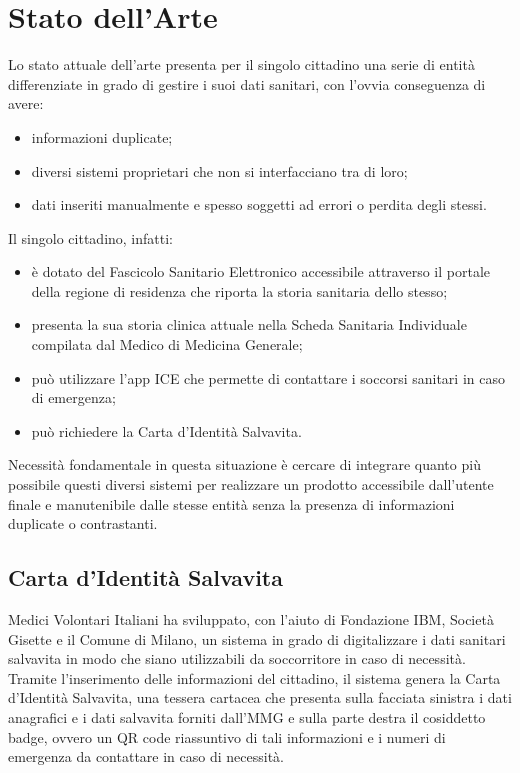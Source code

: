 \documentclass[12pt,a4paper,twoside,openright,titlepage]{book}
\begin{document}
\section{Stato dell'Arte}
Lo stato attuale dell'arte presenta per il singolo cittadino una serie di entità differenziate in grado di gestire i suoi dati sanitari, con l'ovvia conseguenza di avere:
\begin{itemize}
\item informazioni duplicate;
\item diversi sistemi proprietari che non si interfacciano tra di loro;
\item dati inseriti manualmente e spesso soggetti ad errori o perdita degli stessi.
\end{itemize}
Il singolo cittadino, infatti:
\begin{itemize}
\item è dotato del Fascicolo Sanitario Elettronico accessibile attraverso il portale della regione di residenza che riporta la storia sanitaria dello stesso;
\item presenta la sua storia clinica attuale nella Scheda Sanitaria Individuale compilata dal Medico di Medicina Generale;
\item può utilizzare l'app ICE che permette di contattare i soccorsi sanitari in caso di emergenza;
\item può richiedere la Carta d'Identità Salvavita.
\end{itemize}
Necessità fondamentale in questa situazione è cercare di integrare quanto più possibile questi diversi sistemi per realizzare un prodotto accessibile dall'utente finale e manutenibile dalle stesse entità senza la presenza di informazioni duplicate o contrastanti.

\subsection{Carta d'Identità Salvavita}
Medici Volontari Italiani ha sviluppato, con l'aiuto di Fondazione IBM, Società Gisette e il Comune di Milano, un sistema in grado di digitalizzare i dati sanitari salvavita in modo che siano utilizzabili da soccorritore in caso di necessità. Tramite l'inserimento delle informazioni del cittadino, il sistema genera la Carta d'Identità Salvavita, una tessera cartacea che presenta sulla facciata sinistra i dati anagrafici e i dati salvavita forniti dall'MMG e sulla parte destra il cosiddetto badge, ovvero un QR code riassuntivo di tali informazioni e i numeri di emergenza da contattare in caso di necessità.
\end{document}
